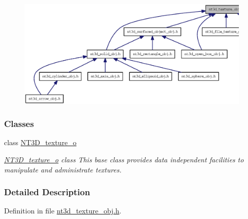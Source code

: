 \begin{figure}[H]
\begin{center}
\leavevmode
\includegraphics[width=400pt]{nt3d__texture__obj_8h__dep__incl}
\end{center}
\end{figure}
\subsubsection*{Classes}
\begin{DoxyCompactItemize}
\item 
class \hyperlink{class_n_t3_d__texture__o}{NT3D\_\-texture\_\-o}
\begin{DoxyCompactList}\small\item\em \hyperlink{class_n_t3_d__texture__o}{NT3D\_\-texture\_\-o} class This base class provides data independent facilities to manipulate and administrate textures. \item\end{DoxyCompactList}\end{DoxyCompactItemize}


\subsubsection{Detailed Description}


Definition in file \hyperlink{nt3d__texture__obj_8h_source}{nt3d\_\-texture\_\-obj.h}.

